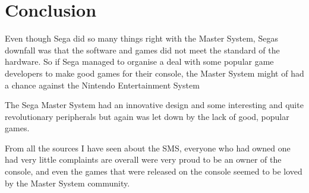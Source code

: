 \documentclass{scrartcl}
\begin{document}
\section{Conclusion}

Even though Sega did so many things right with the Master System, Segas downfall was that the software and games did not meet the standard of the hardware. So if Sega managed to organise a deal with some popular game developers to make good games for their console, the Master System might of had a chance against the Nintendo Entertainment System

The Sega Master System had an innovative design and some interesting and quite revolutionary peripherals but again was let down by the lack of good, popular games. 

From all the sources I have seen about the SMS, everyone who had owned one had very little complaints are overall were very proud to be an owner of the console, and even the games that were released on the console seemed to be loved by the Master System community. 




\end{document}
